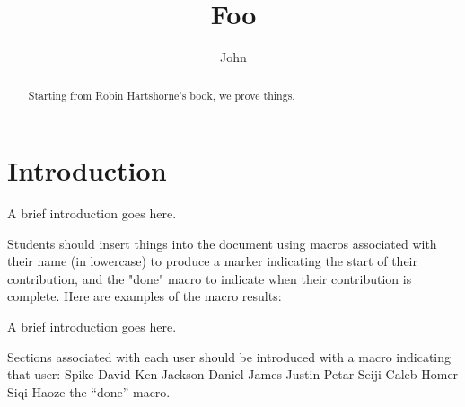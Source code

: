 \documentclass[11pt,notitlepage]{report}
\begin{document}
\title{Foo}
\author{John}
\maketitle

\begin{abstract}
Starting from Robin Hartshorne's book, we prove things.
\end{abstract}


\chapter*{Introduction}
A brief introduction goes here.

Students should insert things into the document using
macros associated with their name (in lowercase) to produce a marker indicating the start of their contribution, and the "done" macro to indicate when their contribution is complete. Here are examples of the macro results:

A brief introduction goes here.

Sections associated with each user should be introduced with a macro indicating that user:
\spike Spike
\david David
\ken Ken
\jackson Jackson
\daniel Daniel
\james James
\justin Justin
\petar Petar
\seiji Seiji
\caleb Caleb
\homer Homer
\siqi Siqi
\haoze Haoze
\done the ``done'' macro.






\end{document}
